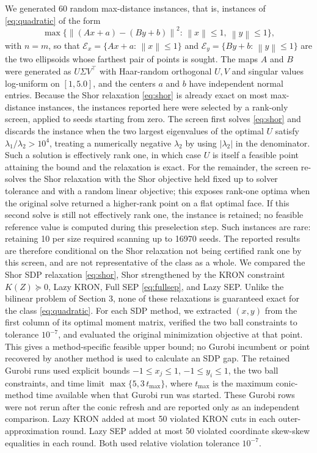 \documentclass[11pt]{article}
\providecommand{\Ecal}{\mathcal{E}}
\providecommand{\suchthat}{:\,}
\providecommand{\norm}[1]{\left\lVert #1\right\rVert}
\begin{document}
\noindent We generated 60 random max-distance instances, that is,
instances of \eqref{eq:quadratic} of the form
\[
\max\{\norm{(Ax+a)-(By+b)}^2\suchthat \norm{x}\le 1,\ \norm{y}\le 1\},
\]
with \(n=m\), so that \(\Ecal_x=\{Ax+a\suchthat\norm{x}\le 1\}\) and
\(\Ecal_y=\{By+b\suchthat\norm{y}\le 1\}\) are the two ellipsoids whose
farthest pair of points is sought.  The maps \(A\) and \(B\) were generated as
\(U\Sigma V^\top\) with Haar-random orthogonal \(U,V\) and singular values log-uniform on \([1,5.0]\), and the centers \(a\) and \(b\) have independent normal
entries.  Because the Shor relaxation \eqref{eq:shor} is already exact on most max-distance instances, the instances reported here were selected by a rank-only screen, applied to seeds starting from zero.  The screen first solves \eqref{eq:shor} and discards the instance when the two largest eigenvalues of the optimal \(U\) satisfy \(\lambda_1/\lambda_2>10^4\), treating a numerically negative \(\lambda_2\) by using \(|\lambda_2|\) in the denominator.  Such a solution is effectively rank one, in which case \(U\) is itself a feasible point attaining the bound and the relaxation is exact.  For the remainder, the screen re-solves the Shor relaxation with the Shor objective held fixed up to solver tolerance and with a random linear objective; this exposes rank-one optima when the original solve returned a higher-rank point on a flat optimal face.  If this second solve is still not effectively rank one, the instance is retained; no feasible reference value is computed during this preselection step.  Such instances are rare: retaining 10 per size required scanning up to 16970 seeds.  The reported results are therefore conditional on the Shor relaxation not being certified rank one by this screen, and are not representative of the class as a whole.
We compared the Shor SDP relaxation \eqref{eq:shor}, Shor strengthened by the
KRON constraint \(K(Z)\succeq 0\), Lazy KRON, Full SEP \eqref{eq:fullsep}, and
Lazy SEP.
Unlike the bilinear problem of Section 3, none of these relaxations is
guaranteed exact for the class \eqref{eq:quadratic}.  For each SDP method, we extracted
\((x,y)\) from the first column of its optimal moment matrix, verified the two
ball constraints to tolerance \(10^{-7}\), and evaluated the original
minimization objective at that point.  This gives a method-specific feasible
upper bound; no Gurobi incumbent or point recovered by another method is used
to calculate an SDP gap.  The retained Gurobi runs used explicit bounds \(-1\le x_j\le 1\), \(-1\le y_i\le 1\), the two ball constraints, and time limit \(\max\{5,3\,t_{\max}\}\), where \(t_{\max}\) is the maximum conic-method time available when that Gurobi run was started.  These Gurobi rows were not rerun after the conic refresh and are reported only as an independent comparison.  Lazy KRON added at most 50 violated KRON cuts in each
outer-approximation round.  Lazy SEP added at most 50 violated coordinate
skew-skew equalities in each round.  Both used relative violation tolerance
\(10^{-7}\).
\end{document}
